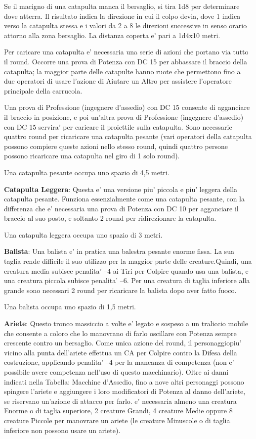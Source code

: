 \documentclass[a4paper,11pt,twoside,openany]{book}
\begin{document}
{Se il macigno di una catapulta manca il bersaglio, si tira 1d8 per determinare dove atterra. Il risultato indica la direzione in cui il colpo devia, dove 1 indica verso la catapulta stessa e i valori da 2 a 8 le direzioni successive in senso orario attorno alla zona bersaglio. La distanza coperta e' pari a 1d4x10 metri.

Per caricare una catapulta e' necessaria una serie di azioni che portano via tutto il round. Occorre una prova di Potenza con DC 15 per abbassare il braccio della catapulta; la maggior parte delle catapulte hanno ruote che permettono fino a due operatori di usare l'azione di Aiutare un Altro per assistere l'operatore principale della carrucola.

Una prova di Professione (ingegnere d'assedio) con DC 15 consente di agganciare il braccio in posizione, e poi un'altra prova di Professione (ingegnere d'assedio) con DC 15 servira' per caricare il proiettile sulla catapulta. Sono necessarie quattro round per ricaricare una catapulta pesante (vari operatori della catapulta possono compiere queste azioni nello stesso round, quindi quattro persone possono ricaricare una catapulta nel giro di 1 solo round).

Una catapulta pesante occupa uno spazio di 4,5 metri.

\textbf{Catapulta Leggera}: Questa e' una versione piu' piccola e piu' leggera della catapulta pesante. Funziona essenzialmente come una catapulta pesante, con la differenza che e' necessaria una prova di Potenza con DC 10 per agganciare il braccio al suo posto, e soltanto 2 round per ridirezionare la catapulta.

Una catapulta leggera occupa uno spazio di 3 metri.

\textbf{Balista}: Una balista e' in pratica una balestra pesante enorme fissa. La sua taglia rende difficile il suo utilizzo per la maggior parte delle creature.Quindi, una creatura media subisce penalita' --4 ai Tiri per Colpire quando usa una balista, e una creatura piccola subisce penalita' --6. Per una creatura di taglia inferiore alla grande sono necessari 2 round per ricaricare la balista dopo aver fatto fuoco.

Una balista occupa uno spazio di 1,5 metri.

\textbf{Ariete}: Questo tronco massiccio a volte e' legato e sospeso a un traliccio mobile che consente a coloro che lo manovrano di farlo oscillare con Potenza sempre crescente contro un bersaglio. Come unica azione del round, il personaggiopiu' vicino alla punta dell'ariete effettua un CA per Colpire contro la Difesa della costruzione, applicando penalita' --4 per la mancanza di competenza (non e' possibile avere competenza nell'uso di questo macchinario). Oltre ai danni indicati nella Tabella: Macchine d'Assedio, fino a nove altri personaggi possono spingere l'ariete e aggiungere i loro modificatori di Potenza al danno dell'ariete, se riservano un'azione di attacco per farlo. e' necessaria almeno una creatura Enorme o di taglia superiore, 2 creature Grandi, 4 creature Medie oppure 8 creature Piccole per manovrare un ariete (le creature Minuscole o di taglia inferiore non possono usare un ariete).

}
\end{document}
